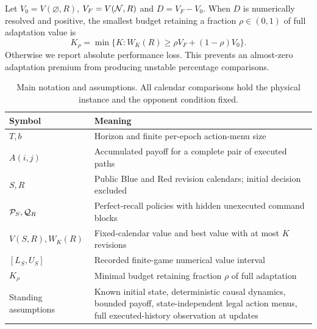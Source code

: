 Let $V_0=V(\varnothing,R)$, $V_F=V(\mathcal N,R)$ and $D=V_F-V_0$.
When $D$ is numerically resolved and positive, the smallest budget retaining
a fraction $\rho\in(0,1)$ of full adaptation value is
\begin{equation}
 K_\rho=\min\{K:W_K(R)\ge\rho V_F+(1-\rho)V_0\}.
 \label{eq:retention}
\end{equation}
Otherwise we report absolute performance loss. This prevents an almost-zero
adaptation premium from producing unstable percentage comparisons.

\begin{table}[t]
\centering\small
\caption{Main notation and assumptions. All calendar comparisons hold the physical instance and the opponent condition fixed.}\label{tab:notation}
\begin{tabular}{p{.18\linewidth}p{.73\linewidth}}
\toprule
Symbol & Meaning \\
\midrule
$T,b$ & Horizon and finite per-epoch action-menu size \\
$A(i,j)$ & Accumulated payoff for a complete pair of executed paths \\
$S,R$ & Public Blue and Red revision calendars; initial decision excluded \\
$\mathcal P_S,\mathcal Q_R$ & Perfect-recall policies with hidden unexecuted command blocks \\
$V(S,R),W_K(R)$ & Fixed-calendar value and best value with at most $K$ revisions \\
$[L_S,U_S]$ & Recorded finite-game numerical value interval \\
$K_\rho$ & Minimal budget retaining fraction $\rho$ of full adaptation \\
Standing assumptions & Known initial state, deterministic causal dynamics, bounded payoff, state-independent legal action menus, full executed-history observation at updates \\
\bottomrule
\end{tabular}
\end{table}
